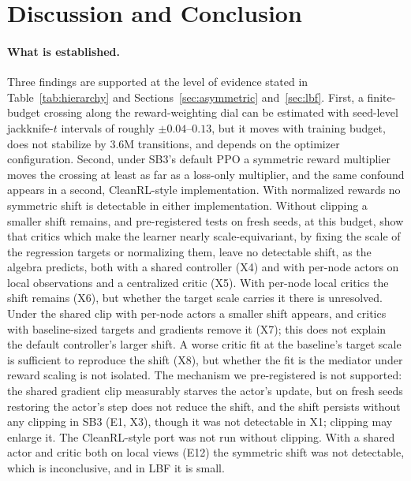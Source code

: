 
\section{Discussion and Conclusion}
\label{sec:discussion}

\paragraph{What is established.}
Three findings are supported at the level of evidence stated in Table~\ref{tab:hierarchy} and
Sections~\ref{sec:asymmetric} and~\ref{sec:lbf}. First, a finite-budget crossing along the reward-weighting
dial can be estimated with seed-level jackknife-$t$ intervals of roughly $\pm0.04$--$0.13$, but it moves with training
budget, does not stabilize by 3.6M transitions, and depends on the optimizer configuration. Second, under
SB3's default PPO a symmetric reward multiplier moves the crossing at least as far as a loss-only multiplier, and
the same confound appears in a second, CleanRL-style implementation. With normalized rewards no symmetric shift is
detectable in either implementation. Without clipping a smaller shift remains, and pre-registered tests on fresh
seeds, at this budget, show that critics which make the learner nearly scale-equivariant, by fixing the scale of the regression targets or normalizing them, leave no detectable shift, as the algebra predicts, both with a shared controller (X4) and with per-node actors on local observations and a
centralized critic (X5). With per-node local critics the shift remains (X6), but whether the target scale carries it
there is unresolved. Under the shared clip with per-node actors a smaller shift appears, and critics with
baseline-sized targets and gradients remove it (X7); this does not explain the default controller's larger shift. A
worse critic fit at the baseline's target scale is sufficient to reproduce the shift (X8), but whether the fit is the
mediator under reward scaling is not isolated. The mechanism we pre-registered is not supported: the shared gradient clip measurably starves the actor's
update, but on fresh seeds restoring the actor's step does not reduce the shift, and the shift persists without any
clipping in SB3 (E1, X3), though it was not detectable in X1; clipping may enlarge it. The CleanRL-style port was not
run without clipping. With a shared actor and critic both on local views (E12) the symmetric shift was not detectable,
which is inconclusive, and in LBF it is small.
